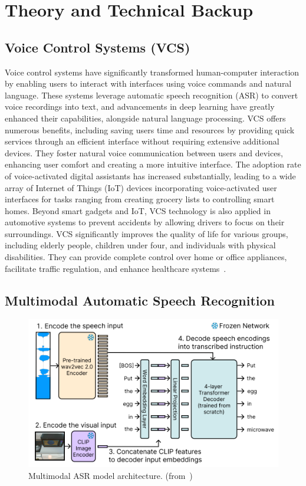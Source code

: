 \documentclass[12pt]{extarticle}
\begin{document}
\newpage
\section{Theory and Technical Backup}

\subsection{Voice Control Systems (VCS)}
Voice control systems have significantly transformed human-computer interaction by enabling users to interact with interfaces using voice commands and natural language. These systems leverage automatic speech recognition (ASR) to convert voice recordings into text, and advancements in deep learning have greatly enhanced their capabilities, alongside natural language processing. VCS offers numerous benefits, including saving users time and resources by providing quick services through an efficient interface without requiring extensive additional devices. They foster natural voice communication between users and devices, enhancing user comfort and creating a more intuitive interface. The adoption rate of voice-activated digital assistants has increased substantially, leading to a wide array of Internet of Things (IoT) devices incorporating voice-activated user interfaces for tasks ranging from creating grocery lists to controlling smart homes. Beyond smart gadgets and IoT, VCS technology is also applied in automotive systems to prevent accidents by allowing drivers to focus on their surroundings. VCS significantly improves the quality of life for various groups, including elderly people, children under four, and individuals with physical disabilities. They can provide complete control over home or office appliances, facilitate traffic regulation, and enhance healthcare systems~\cite{vcs}.

\subsection{Multimodal Automatic Speech Recognition}

\begin{figure}[htbp]
    \centering
    \includegraphics[width=0.8\linewidth]{asr}
    \caption{Multimodal ASR model architecture.
    (from~\cite{Chang2023})}
    \label{fig:asr}
\end{figure}
\end{document}
